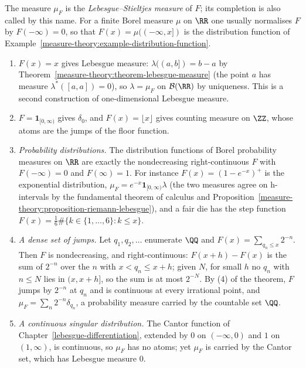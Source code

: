\begin{definition}\label{measure-theory:definition-lebesgue-stieltjes}
The measure $\mu_F$ is the \emph{Lebesgue--Stieltjes measure} of $F$; its completion is also called by this name. For a finite Borel measure $\mu$ on $\RR$ one usually normalises $F$ by
$F(-\infty) = 0$, so that $F(x) = \mu((-\infty, x])$ is the distribution function of Example~\ref{measure-theory:example-distribution-function}.
\end{definition}

\begin{example}\label{measure-theory:example-lebesgue-stieltjes}
\begin{enumerate}
\item $F(x) = x$ gives Lebesgue measure: $\lambda((a, b]) = b - a$ by Theorem~\ref{measure-theory:theorem-lebesgue-measure} (the point $a$ has measure $\lambda^*([a, a]) = 0$), so $\lambda = \mu_F$ on
$\mathcal{B}(\RR)$ by uniqueness. This is a second construction of one-dimensional Lebesgue measure.
\item $F = \mathbf{1}_{[0, \infty)}$ gives $\delta_0$, and $F(x) = \lfloor x\rfloor$ gives counting measure on $\ZZ$, whose atoms are the jumps of the floor function.
\item \emph{Probability distributions.} The distribution functions of Borel probability measures on $\RR$ are exactly the nondecreasing right-continuous $F$ with $F(-\infty) = 0$ and $F(\infty) = 1$.
For instance $F(x) = (1 - e^{-x})^+$ is the exponential distribution, $\mu_F = e^{-x}\mathbf{1}_{[0, \infty)}\lambda$ (the two measures agree on h-intervals by the fundamental theorem of calculus and
Proposition~\ref{measure-theory:proposition-riemann-lebesgue}), and a fair die has the step function $F(x) = \frac16\#\{k \in \{1, \ldots, 6\} : k \leq x\}$.
\item \emph{A dense set of jumps.} Let $q_1, q_2, \ldots$ enumerate $\QQ$ and $F(x) = \sum_{q_n \leq x}2^{-n}$. Then $F$ is nondecreasing, and right-continuous: $F(x + h) - F(x)$ is the sum of $2^{-n}$
over the $n$ with $x < q_n \leq x + h$; given $N$, for small $h$ no $q_n$ with $n \leq N$ lies in $(x, x + h]$, so the sum is at most $2^{-N}$. By (4) of the theorem, $F$ jumps by $2^{-n}$ at $q_n$
and is continuous at every irrational point, and $\mu_F = \sum_n2^{-n}\delta_{q_n}$, a probability measure carried by the countable set $\QQ$.
\item \emph{A continuous singular distribution.} The Cantor function of Chapter~\ref{lebesgue-differentiation}, extended by $0$ on $(-\infty, 0)$ and $1$ on $(1, \infty)$, is continuous, so $\mu_F$ has no
atoms; yet $\mu_F$ is carried by the Cantor set, which has Lebesgue measure $0$.
\end{enumerate}
\end{example}

